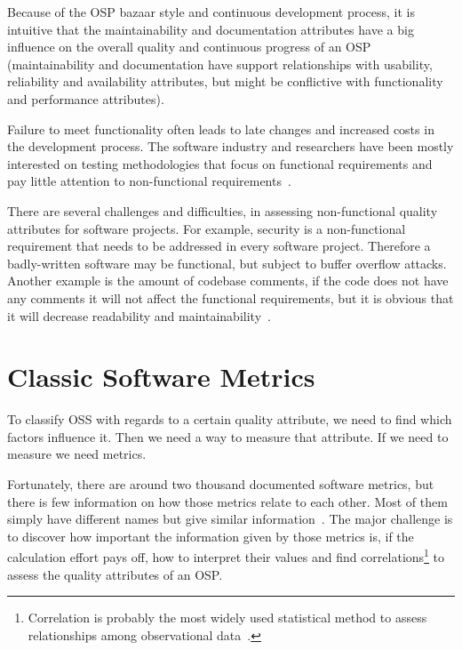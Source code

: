 Because of the OSP bazaar style and continuous development process, it is intuitive that the maintainability and documentation attributes
have a big influence on the overall quality and continuous progress of an OSP
(maintainability and documentation have support relationships
with usability, reliability and availability attributes, but might be conflictive with functionality and performance attributes).

Failure to meet functionality often leads to late changes and increased costs in the development process.
The software industry and researchers have been mostly interested on testing methodologies
that focus on functional requirements and pay little attention to non-functional requirements~\cite{chung2009non}.

There are several challenges and difficulties, in assessing non-functional quality attributes for software projects.
For example, security is a non-functional requirement that needs to be addressed in every software project.
Therefore a badly-written software may be functional, but subject to buffer overflow attacks.
Another example is the amount of codebase comments, if the code does not have any comments it will not affect the functional requirements,
but it is obvious that it will decrease readability and maintainability~\cite{gousios2007software}.

\section{Classic Software Metrics}
To classify OSS with regards to a certain quality attribute, we need to find which factors influence it.
Then we need a way to measure that attribute. If we need to measure we need metrics.

Fortunately, there are around two thousand documented software metrics, but there is few information on how those metrics relate to each other.
Most of them simply have different names but give similar information~\cite{fenton1999software}.
The major challenge is to discover how important the information given by those metrics is, if the calculation effort pays off,
how to interpret their values and find
\textsf{correlations}\footnote{Correlation is probably the most widely used statistical method to assess relationships among observational data~\cite{kan2002metrics}.}
 to assess the quality attributes of an OSP.


